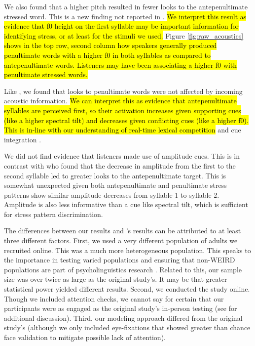 We also found that a higher pitch resulted in fewer looks to the antepenultimate stressed word. This is a new finding not reported in \cite{Sulpizio_McQueen_2012}. \hl{We interpret this result as evidence that f0 height on the first syllable may be important information for identifying stress, or at least for the stimuli we used.} Figure \ref{fig:raw_acoustics} \hl{shows in the top row, second column how speakers generally produced penultimate words with a higher f0 in both syllables as compared to antepenultimate words. Listeners may have been associating a higher f0 with penultimate stressed words. }

Like \cite{Sulpizio_McQueen_2012}, we found that looks to penultimate words were not affected by incoming acoustic information. \hl{We can interpret this as evidence that  antepenultimate syllables are perceived first, so their activation increases given supporting cues (like a higher spectral tilt) and decreases given conflicting cues (like a higher f0). This is in-line with our understanding of real-time lexical competition} \citep{Marslen1980} and cue integration \citep{Kong2016, mcmurray_2008}.

We did not find evidence that listeners made use of amplitude cues. This is in contrast with \cite{Sulpizio_McQueen_2012} who found that the decrease in amplitude from the first to the second syllable led to greater looks to the antepenultimate target. This is somewhat unexpected given both antepenultimate and penultimate stress patterns show similar amplitude decreases from syllable 1 to syllable 2. Amplitude is also less informative than a cue like spectral tilt, which is sufficient for stress pattern discrimination.  

The differences between our results and \cite{Sulpizio_McQueen_2012}'s results can be attributed to at least three different factors. First, we used a very different population of adults we recruited online. This was a much more heterogeneous population. This speaks to the importance in testing varied populations and ensuring that non-WEIRD populations are part of psycholinguistics research \citep{frost2021investigating}. Related to this, our sample size was over twice as large as the original study's. It may be that greater statistical power yielded different results. Second, we conducted the study online. Though we included attention checks, we cannot say for certain that our participants were as engaged as the original study's in-person testing (see \cite{rodd2024moving} for additional discussion). Third, our modeling approach differed from the original study's (although we only included eye-fixations that showed greater than chance face validation to mitigate possible lack of attention).


